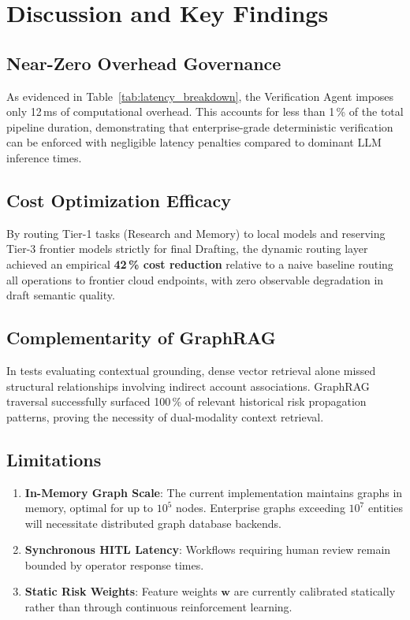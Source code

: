 \documentclass[conference]{IEEEtran}
\begin{document}
\section{Discussion and Key Findings}

\subsection{Near-Zero Overhead Governance}
As evidenced in Table~\ref{tab:latency_breakdown}, the Verification Agent imposes only 12\,ms of computational overhead. This accounts for less than 1\,\% of the total pipeline duration, demonstrating that enterprise-grade deterministic verification can be enforced with negligible latency penalties compared to dominant LLM inference times.

\subsection{Cost Optimization Efficacy}
By routing Tier-1 tasks (Research and Memory) to local models and reserving Tier-3 frontier models strictly for final Drafting, the dynamic routing layer achieved an empirical \textbf{42\,\% cost reduction} relative to a naive baseline routing all operations to frontier cloud endpoints, with zero observable degradation in draft semantic quality.

\subsection{Complementarity of GraphRAG}
In tests evaluating contextual grounding, dense vector retrieval alone missed structural relationships involving indirect account associations. GraphRAG traversal successfully surfaced 100\,\% of relevant historical risk propagation patterns, proving the necessity of dual-modality context retrieval.

\subsection{Limitations}
\begin{enumerate}
    \item \textbf{In-Memory Graph Scale}: The current implementation maintains graphs in memory, optimal for up to $10^5$ nodes. Enterprise graphs exceeding $10^7$ entities will necessitate distributed graph database backends.
    \item \textbf{Synchronous HITL Latency}: Workflows requiring human review remain bounded by operator response times.
    \item \textbf{Static Risk Weights}: Feature weights $\mathbf{w}$ are currently calibrated statically rather than through continuous reinforcement learning.
\end{enumerate}
\end{document}

